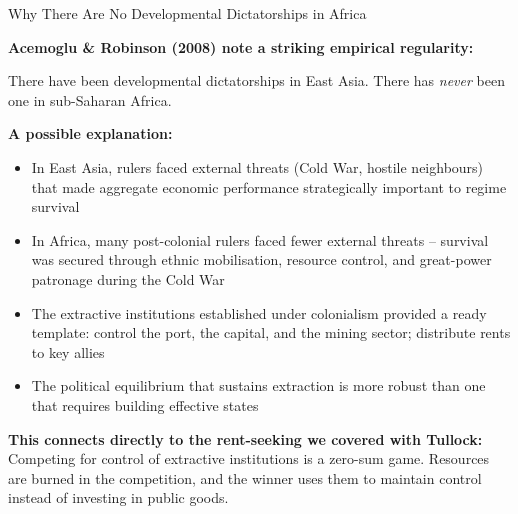 \documentclass[10pt]{beamer}
\begin{document}
\begin{frame}[allowframebreaks]{Why There Are No Developmental Dictatorships in Africa}

\textbf{Acemoglu \& Robinson (2008) note a striking empirical regularity:}

There have been developmental dictatorships in East Asia. There has \emph{never} been one in sub-Saharan Africa.


\textbf{A possible explanation:}

\begin{itemize}
\item In East Asia, rulers faced \alert{external threats} (Cold War, hostile neighbours) that made aggregate economic performance strategically important to regime survival
\item In Africa, many post-colonial rulers faced fewer external threats -- survival was secured through ethnic mobilisation, resource control, and great-power patronage during the Cold War
\item The extractive institutions established under colonialism provided a ready template: control the port, the capital, and the mining sector; distribute rents to key allies
\item \alert{The political equilibrium that sustains extraction is more robust than one that requires building effective states}
\end{itemize}


\textbf{This connects directly to the rent-seeking we covered with Tullock:}\\
Competing for control of extractive institutions is a zero-sum game. Resources are burned in the competition, and the winner uses them to maintain control instead of investing in public goods.
\end{frame}
\end{document}

